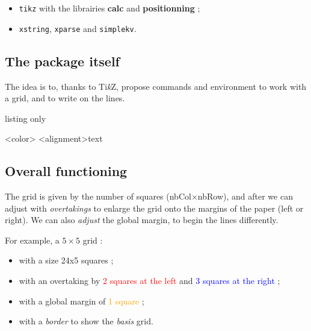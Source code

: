 \documentclass[a4paper]{article}
\newcommand\tikzlogo{Ti\textit{k}Z}
\let\TikZ\tikzlogo
\newcommand\Cle[1]{{\bfseries\sffamily\textlangle #1\textrangle}}
\begin{document}
\begin{itemize}
	\item \texttt{tikz} with the librairies \Cle{calc} and \Cle{positionning} ;
	\item \texttt{xstring}, \texttt{xparse} and \texttt{simplekv}.
\end{itemize}

\subsection{The package itself}

The idea is to, thanks to \TikZ, propose commands and environment to work with a grid, and to write on the lines.

\begin{PresentationCode}{listing only}

\begin{EnvGrid}[keys]<color>
	\WriteLine[keys]<alignment>{text}
	\PassLine
\end{EnvGrid}
\end{PresentationCode}

\subsection{Overall functioning}

The grid is given by the number of squares (nbCol$\times$nbRow), and after we can adjust with \textit{overtakings} to enlarge the grid onto the margins of the paper (left or right). We can also \textit{adjust} the global margin, to begin the lines differently.

\medskip

For example, a $5\times5$ grid :

\begin{itemize}
	\item with a size 24x5 squares ;
	\item with an overtaking by \textcolor{red}{2 squares at the left} and \textcolor{blue}{3 squares at the right} ;
	\item with a global margin of \textcolor{orange}{1 square} ;
	\item with a \textcolor{green!50!black}{\textit{border}} to show the \textit{basis} grid.
\end{itemize}
\end{document}
